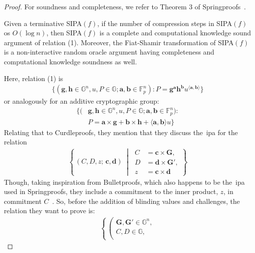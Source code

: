 \begin{proof}
    For soundness and completeness, we refer to Theorem 3 of Springproofs~\cite{zhang2024springproofs}.
    \begin{theorem}
        Given a terminative SIPA$(f)$, if the number of compression steps in SIPA$(f)$ os $O(\log n)$, then SIPA$(f)$ is a complete and computational knowledge sound argument of relation (1).
        Moreover, the Fiat-Shamir transformation of SIPA$(f)$ is a non-interactive random oracle argument having completeness and computational knowledge soundness as well.
    \end{theorem}
    Here, relation (1) is
    \begin{align}
        \{(\mathbf{g},\mathbf{h}\in\mathbb{G}^n,u,P\in\mathbb{G};\mathbf{a},\mathbf{b}\in\mathbb{F}_p^n):P=\mathbf{g}^\mathbf{a}\mathbf{h}^\mathbf{b}u^{\langle \mathbf{a},\mathbf{b}\rangle}\}
    \end{align}
    or analogously for an additive cryptographic group:
    \begin{align}
        \{(&\mathbf{g},\mathbf{h}\in\mathbb{G}^n,u,P\in\mathbb{G};\mathbf{a},\mathbf{b}\in\mathbb{F}_p^n):\\
        &P=\mathbf{a}\times\mathbf{g}+\mathbf{b}\times\mathbf{h}+\langle \mathbf{a},\mathbf{b}\rangle u\}\label{al:P}
    \end{align}
    Relating that to Curdleproofs, they mention that they discuss the~\gls{ipa} for the relation
    \begin{align}
        \left\{
        \,(C,D,z;\,\mathbf{c},\mathbf{d})\;\middle|\;
        \begin{aligned}
            C &= \mathbf{c} \times \mathbf{G},\\
            D &= \mathbf{d} \times \mathbf{G'},\\
            z &= \mathbf{c} \times \mathbf{d}
        \end{aligned}
        \right\}
    \end{align}
    Though, taking inspiration from Bulletproofs, which also happens to be the~\gls{ipa} used in Springproofs, they include a commitment to the inner product, $z$, in commitment $C$~\cite{bunz2018bulletproofs}.
    So, before the addition of blinding values and challenges, the relation they want to prove is:
    \begin{align}
        \left\{
        \, \left(
        \begin{aligned}
            \mathbf{G},\mathbf{G'}\in\mathbb{G}^n,\\
            C,D\in\mathbb{G},\\

\end{aligned}
\end{align}
\end{proof}
